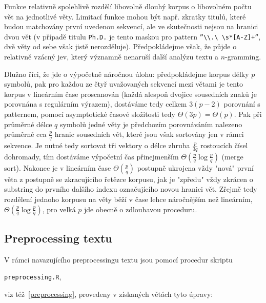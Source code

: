 Funkce relativně spolehlivě rozdělí libovolně dlouhý korpus o libovolném
počtu vět na jednotlivé věty. Limitací funkce mohou být např. zkratky
titulů, které budou matchovány první uvedenou sekvencí, ale ve skutečnosti
nejsou na hranici dvou vět (v případě titulu \texttt{Ph.D.} je tento maskou
pro pattern \texttt{''\textbackslash \textbackslash .\textbackslash
\textbackslash s*[A-Z]+''}, dvě věty od sebe však jistě nerozděluje).
Předpokládejme však, že půjde o relativně vzácný jev, který významně nenaruší
další analýzu textu a $n$-gramming.

Dlužno říci, že jde o výpočetně náročnou úlohu: předpokládejme korpus délky
$p$ symbolů, pak pro každou ze čtyř uvažovaných sekvencí mezi větami je tento
korpus v lineárním čase proscanován
(každá alespoň dvojice sousedních znaků je
porovnána s regulárním výrazem), dostáváme tedy celkem $3(p-2)$ porovnání
s patternem, pomocí asymptotické časové složitosti tedy
$\Theta(3p) = \Theta(p)$. Pak při průměrné délce $q$ symbolů jedné věty je
předchozím porovnáváním nalezeno průměrně cca $\frac{p}{q}$ hranic sousedních
vět, které jsou však sortovány jen v rámci sekvence. Je nutné tedy sortovat
tři vektory o délce zhruba $\frac{p}{3q}$ rostoucích čísel dohromady,
tím dostáváme výpočetní čas přinejmenším $\Theta(\frac{p}{q} \log \frac{p}{q})$
(merge sort). Nakonec je v lineárním čase $\Theta(\frac{p}{q})$ postupně
ukrojena vždy "nová" první věta z postupně se zkracujícího řetězce korpusu,
jak je "zpředu" vždy zkrácen o substring do prvního dalšího indexu označujícího
novou hranici vět. Zřejmě tedy rozdělení jednoho korpusu na věty běží v čase
lehce náročnějším než lineárním,
$\Theta(\frac{p}{q} \log \frac{p}{q})$, pro
velká $p$ jde obecně o zdlouhavou proceduru.


\subsection{Preprocessing textu}

V rámci navazujícího preprocessingu textu jsou pomocí procedur skriptu

\begin{center}
\texttt{preprocessing.R},
\end{center}


viz též~\ref{preprocessing}, provedeny v získaných větách tyto
úpravy:

